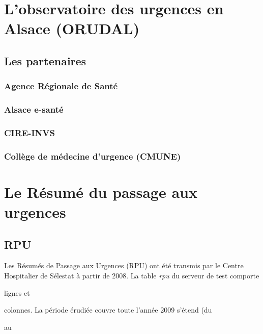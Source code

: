 \documentclass[12pt,english,french]{report}\usepackage{graphicx, color}
\begin{document}
\chapter{L'observatoire des urgences en Alsace (ORUDAL)}
  \section*{Les partenaires}
  \subsection*{Agence Régionale de Santé}
  \subsection*{Alsace e-santé}
  \subsection*{CIRE-INVS}
  \subsection*{Collège de médecine d'urgence (CMUNE)}
\chapter{Le Résumé du passage aux urgences}


\section*{RPU}

Les Résumés de Passage aux Urgences (RPU) ont été transmis par le Centre Hospitalier de Sélestat à partir de 2008. 
La table \emph{rpu} du serveur de test comporte 

{\ttfamily\noindent\bfseries\color{errorcolor}{\\Error in nrow(d2) : objet 'd2' introuvable}} lignes et 

{\ttfamily\noindent\bfseries\color{errorcolor}{\\Error in ncol(d2) : objet 'd2' introuvable}} colonnes. La période érudiée couvre toute l'année 2009 s'étend (du 

{\ttfamily\noindent\bfseries\color{errorcolor}{\\Error in eval(expr, envir, enclos) : objet 'd2' introuvable}} au 
\end{document}
